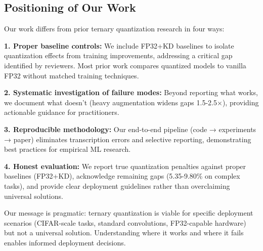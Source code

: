 \subsection{Positioning of Our Work}

Our work differs from prior ternary quantization research in four ways:

\textbf{1. Proper baseline controls:} We include FP32+KD baselines to isolate quantization effects from training improvements, addressing a critical gap identified by reviewers. Most prior work compares quantized models to vanilla FP32 without matched training techniques.

\textbf{2. Systematic investigation of failure modes:} Beyond reporting what works, we document what doesn't (heavy augmentation widens gaps 1.5-2.5×), providing actionable guidance for practitioners.

\textbf{3. Reproducible methodology:} Our end-to-end pipeline (code → experiments → paper) eliminates transcription errors and selective reporting, demonstrating best practices for empirical ML research.

\textbf{4. Honest evaluation:} We report true quantization penalties against proper baselines (FP32+KD), acknowledge remaining gaps (5.35-9.80\% on complex tasks), and provide clear deployment guidelines rather than overclaiming universal solutions.

Our message is pragmatic: ternary quantization is viable for specific deployment scenarios (CIFAR-scale tasks, standard convolutions, FP32-capable hardware) but not a universal solution. Understanding where it works and where it fails enables informed deployment decisions.
